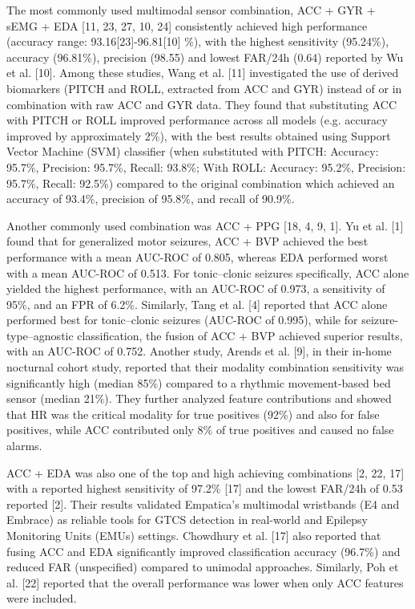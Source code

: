 The most commonly used multimodal sensor combination, ACC + GYR + sEMG + EDA [11, 23, 27, 10, 24] consistently achieved high performance  (accuracy range: 93.16[23]-96.81[10] \%), with the highest sensitivity (95.24\%), accuracy (96.81\%), precision (98.55) and lowest FAR/24h (0.64) reported by Wu et al.  [10]. Among these studies, Wang et al. [11] investigated the use of derived biomarkers (PITCH and ROLL, extracted from ACC and GYR) instead of or in combination with raw ACC and GYR data. They found that substituting ACC with PITCH or ROLL improved performance across all models  (e.g. accuracy improved by approximately 2\%), with the best results obtained using Support Vector Machine (SVM) classifier  (when substituted with PITCH: Accuracy: 95.7\%, Precision: 95.7\%, Recall: 93.8\%; With ROLL: Accuracy: 95.2\%, Precision: 95.7\%, Recall: 92.5\%) compared to the original combination which achieved an accuracy of 93.4\%, precision of 95.8\%, and recall of 90.9\%.

Another commonly used combination was ACC + PPG [18, 4, 9, 1]. Yu et al. [1] found that for generalized motor seizures, ACC + BVP achieved the best performance with a mean AUC-ROC of 0.805, whereas EDA performed worst with a mean AUC-ROC of 0.513. For tonic–clonic seizures specifically, ACC alone yielded the highest performance, with an AUC-ROC of 0.973, a sensitivity of 95\%, and an FPR of 6.2\%. Similarly, Tang et al. [4] reported that ACC alone performed best for tonic–clonic seizures (AUC-ROC of 0.995), while for seizure-type–agnostic classification, the fusion of ACC + BVP achieved superior results, with an AUC-ROC of 0.752.  Another study, Arends et al.  [9], in their in-home nocturnal cohort study, reported that their modality combination sensitivity was significantly high (median 85\%) compared to a rhythmic movement-based bed sensor (median 21\%). They further analyzed feature contributions and showed that HR was the critical modality for true positives (92\%) and also for false positives, while ACC contributed only 8\% of true positives and caused no false alarms.

ACC + EDA was also one of the top and high achieving combinations [2, 22, 17] with a reported highest sensitivity of 97.2\% [17] and the lowest FAR/24h of 0.53 reported [2]. Their results validated Empatica’s multimodal wristbands (E4 and Embrace) as reliable tools for GTCS detection in real-world and Epilepsy Monitoring Units (EMUs) settings. Chowdhury et al. [17] also reported that fusing ACC and EDA significantly improved classification accuracy (96.7\%) and reduced FAR (unspecified) compared to unimodal approaches. Similarly, Poh et al. [22] reported that the overall performance was lower when   only ACC features were included.

